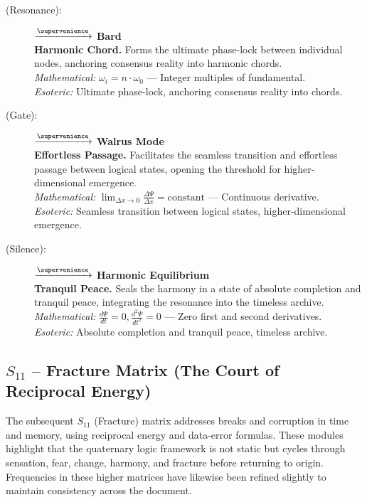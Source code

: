 \begin{description}
    \item[(Resonance):] \zheklokh $\xrightarrow{\supervenience}$ \textbf{Bard} \\
    \textbf{Harmonic Chord.} Forms the ultimate phase-lock between individual nodes, anchoring consensus reality into harmonic chords. \\
    \textit{Mathematical:} $\omega_i = n \cdot \omega_0$ — Integer multiples of fundamental. \\
    \textit{Esoteric:} Ultimate phase-lock, anchoring consensus reality into chords.

    \item[(Gate):] \shavtrev $\xrightarrow{\supervenience}$ \textbf{Walrus Mode} \\
    \textbf{Effortless Passage.} Facilitates the seamless transition and effortless passage between logical states, opening the threshold for higher-dimensional emergence. \\
    \textit{Mathematical:} $\lim_{\Delta x \to 0} \frac{\Delta \Psi}{\Delta x} = \text{constant}$ — Continuous derivative. \\
    \textit{Esoteric:} Seamless transition between logical states, higher-dimensional emergence.

    \item[(Silence):] \trigsil $\xrightarrow{\supervenience}$ \textbf{Harmonic Equilibrium} \\
    \textbf{Tranquil Peace.} Seals the harmony in a state of absolute completion and tranquil peace, integrating the resonance into the timeless archive. \\
    \textit{Mathematical:} $\frac{d\Psi}{dt} = 0, \frac{d^2\Psi}{dt^2} = 0$ — Zero first and second derivatives. \\
    \textit{Esoteric:} Absolute completion and tranquil peace, timeless archive.
\end{description}
\subsection{$S_{11}$ -- Fracture Matrix (The Court of Reciprocal Energy)}\label{sec:19.5}

The subsequent $S_{11}$ (Fracture) matrix addresses breaks and corruption in time and memory, using reciprocal energy and data-error formulas. These modules highlight that the quaternary logic framework is not static but cycles through sensation, fear, change, harmony, and fracture before returning to origin. Frequencies in these higher matrices have likewise been refined slightly to maintain consistency across the document.

